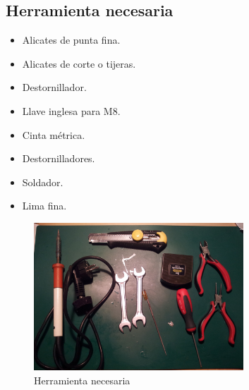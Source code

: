 	\subsection{Herramienta necesaria}
		\begin{itemize}
			\item Alicates de punta fina.
			\item Alicates de corte o tijeras.
			\item Destornillador.
			\item Llave inglesa para M8.
			\item Cinta métrica.
			\item Destornilladores.
			\item Soldador.
			\item Lima fina.
		\end{itemize}
		\begin{figure}[!htp]
			\centering
			\includegraphics[width=0.7\textwidth]{../../Fotos/67b.jpg}
			\caption{Herramienta necesaria}
		\end{figure}
		\newpage{}
